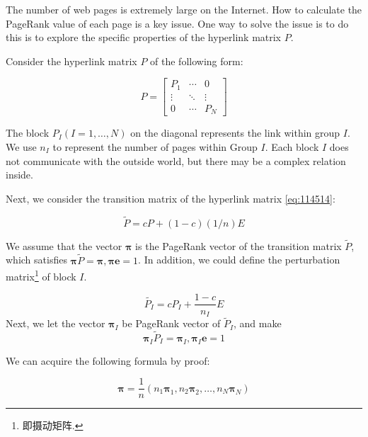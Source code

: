 \documentclass[lettersize,journal,12pt,conference]{IEEEtran}
\begin{document}
The number of web pages is extremely large on the Internet. How to calculate the PageRank value of each page is a key issue. One way to solve the issue is to do this is to explore the specific properties of the hyperlink matrix $P$.

Consider the hyperlink matrix $P$ of the following form:

\begin{equation}
	\label{eq:114514}
	P=
	\begin{bmatrix}
		P_1    & \cdots & 0      \\
		\vdots & \ddots & \vdots \\
		0      & \cdots & P_N
	\end{bmatrix}
\end{equation}

The block $ P_I (I = 1, \ldots, N)$ on the diagonal represents the link within group $I$. We use $n_I$ to represent the number of pages within Group $I$. Each block $I$ does not communicate with the outside world, but there may be a complex relation inside.

Next, we consider the transition matrix of the hyperlink matrix \eqref{eq:114514}:

\begin{equation}
	\label{eq:114515}
	\widetilde{P} = cP  + (1-c)(1/n)E
\end{equation}

We assume that the vector $\boldsymbol{\pi}$ is the PageRank vector of the transition matrix $\widetilde{P}$, which satisfies $\boldsymbol{\pi}\widetilde{P}=\boldsymbol{\pi}, \boldsymbol{\pi e}=1$. In addition, we could define the perturbation matrix\footnote[1]{即摄动矩阵.} of block $I$.

\begin{equation}
	\widetilde{P_I}
	=cP_I + \frac{1-c}{n_I}E
\end{equation}
Next, we let the vector $\boldsymbol{\pi}_I$ be PageRank vector of $\widetilde{P}_I$, and make
\begin{equation}
	\boldsymbol{\pi}_I\widetilde{P}_I = \boldsymbol{\pi}_I, \boldsymbol{\pi}_I\boldsymbol{e}=1
\end{equation}

We can acquire the following formula by proof:

\begin{equation}
	\label{eq:4444}
	\boldsymbol{\pi}=\frac{1}{n}(n_1\boldsymbol{\pi}_1,  n_2\boldsymbol{\pi}_2,\ldots,n_N\boldsymbol{\pi}_N)
\end{equation}
\end{document}
